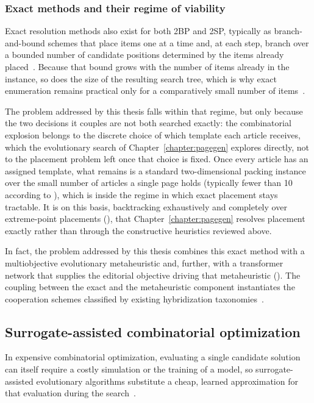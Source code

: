 \subsubsection{Exact methods and their regime of viability}
\label{sec:sota-packing-exact}

Exact resolution methods also exist for both 2BP and 2SP, typically as branch-and-bound schemes that place items one at a time and, at each step, branch over a bounded number of candidate positions determined by the items already placed~\cite{lodi-packing-survey}. Because that bound grows with the number of items already in the instance, so does the size of the resulting search tree, which is why exact enumeration remains practical only for a comparatively small number of items~\cite{lodi-packing-survey}.

The problem addressed by this thesis falls within that regime, but only because the two decisions it couples are not both searched exactly: the combinatorial explosion belongs to the discrete choice of which template each article receives, which the evolutionary search of Chapter~\ref{chapter:pagegen} explores directly, not to the placement problem left once that choice is fixed. Once every article has an assigned template, what remains is a standard two-dimensional packing instance over the small number of articles a single page holds (typically fewer than 10 according to \melody), which is inside the regime in which exact placement stays tractable. It is on this basis, backtracking exhaustively and completely over extreme-point placements (), that Chapter~\ref{chapter:pagegen} resolves placement exactly rather than through the constructive heuristics reviewed above.

In fact, the problem addressed by this thesis combines this exact method with a multiobjective evolutionary metaheuristic and, further, with a transformer network that supplies the editorial objective driving that metaheuristic (). The coupling between the exact and the metaheuristic component instantiates the cooperation schemes classified by existing hybridization taxonomies~\cite{jourdan-hybrid-2009}.

\subsection{Surrogate-assisted combinatorial optimization}
\label{sec:sota-surrogate}

In expensive combinatorial optimization, evaluating a single candidate solution can itself require a costly simulation or the training of a model, so surrogate-assisted evolutionary algorithms substitute a cheap, learned approximation for that evaluation during the search~\cite{liu-2024}.

